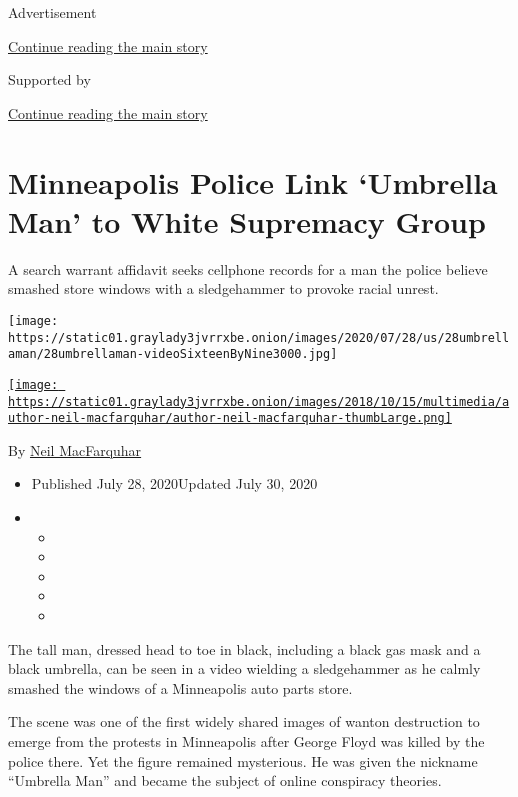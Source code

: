 Advertisement

\protect\hyperlink{after-top}{Continue reading the main story}

Supported by

\protect\hyperlink{after-sponsor}{Continue reading the main story}

\hypertarget{minneapolis-police-link-umbrella-man-to-white-supremacy-group}{%
\section{Minneapolis Police Link `Umbrella Man' to White Supremacy
Group}\label{minneapolis-police-link-umbrella-man-to-white-supremacy-group}}

A search warrant affidavit seeks cellphone records for a man the police
believe smashed store windows with a sledgehammer to provoke racial
unrest.

\texttt{[image: https://static01.graylady3jvrrxbe.onion/images/2020/07/28/us/28umbrellaman/28umbrellaman-videoSixteenByNine3000.jpg]}

\href{https://www.nytimes3xbfgragh.onion/by/neil-macfarquhar}{\texttt{[image: https://static01.graylady3jvrrxbe.onion/images/2018/10/15/multimedia/author-neil-macfarquhar/author-neil-macfarquhar-thumbLarge.png]}}

By \href{https://www.nytimes3xbfgragh.onion/by/neil-macfarquhar}{Neil
MacFarquhar}

\begin{itemize}
\item
  Published July 28, 2020Updated July 30, 2020
\item
  \begin{itemize}
  \item
  \item
  \item
  \item
  \item
  \end{itemize}
\end{itemize}

The tall man, dressed head to toe in black, including a black gas mask
and a black umbrella, can be seen in a video wielding a sledgehammer as
he calmly smashed the windows of a Minneapolis auto parts store.

The scene was one of the first widely shared images of wanton
destruction to emerge from the protests in Minneapolis after George
Floyd was killed by the police there. Yet the figure remained
mysterious. He was given the nickname ``Umbrella Man'' and became the
subject of online conspiracy theories.

